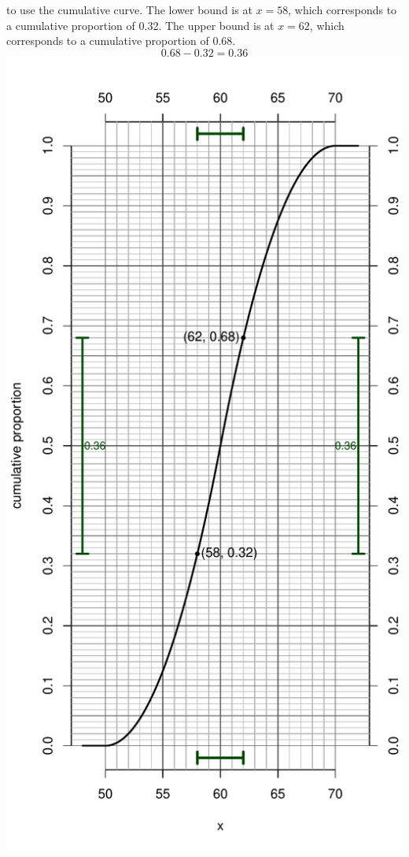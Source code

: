 \begin{solution}
\begin{answerlist}
to use the cumulative curve. The lower bound is at \(x=58\), which
corresponds to a cumulative proportion of 0.32. The upper bound is at
\(x=62\), which corresponds to a cumulative proportion of 0.68.
\[0.68-0.32=0.36\] \includegraphics{unnamed-chunk-13-1.pdf} ~

\end{answerlist}
\end{solution}
